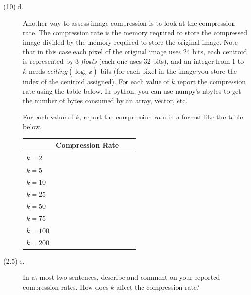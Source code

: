\documentclass[11pt]{article}
\begin{document}
\begin{problem}{35}
\begin{description}
\item [(10) d.]


 Another way to assess image compression is to look at the compression rate. The compression rate is the memory required to store the compressed image divided by the memory required to store the original image. Note that in this case each pixel of the original image uses 24 bits, each centroid is represented by 3 \textit{floats} (each one uses 32 bits), and an integer from 1 to $k$ needs $ceiling(\log_2k)$ bits (for each pixel in the image you store the index of the centroid assigned). For each value of $k$ report the compression rate using the table below. In python, you can use numpy's nbytes to get the number of bytes consumed by an array, vector, etc.


For each value of $k$, report the compression rate in a format like the table below.  


\begin{table}[H]
	\centering
	\begin{tabular}{|l|c|c|c|}
		\hline
		 & Compression Rate \\\hline
		$k = 2$		&            \\\hline
		$k = 5$     &            \\\hline
		$k = 10$		&            \\\hline
		$k = 25$    &            \\\hline
		$k = 50$    &            \\\hline
		$k = 75$    &            \\\hline
		$k = 100$  	&            \\\hline
		$k = 200$  	&            \\\hline
	\end{tabular}
\end{table} 
\item [(2.5) e.]In at most two sentences, describe and comment on your reported compression rates.  How does $k$ affect the compression rate?

\end{description}
\end{problem}

\showpoints
\end{document}
